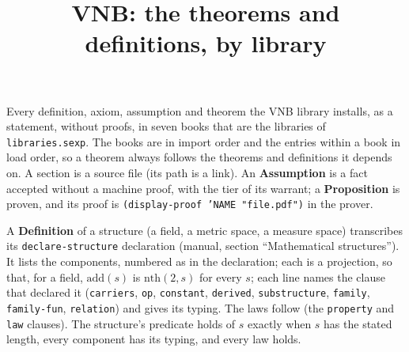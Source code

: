 \documentclass[11pt]{report}
\title{VNB: the theorems and definitions, by library}
\author{}
\date{}
\begin{document}
\maketitle

\noindent
Every definition, axiom, assumption and theorem the VNB library installs, as a
statement, without proofs, in seven books that are the libraries of
\texttt{libraries.sexp}.  The books are in import order and the entries within a
book in load order, so a theorem always follows the theorems and definitions it
depends on.  A section is a source file (its path is a link).  An
\textbf{Assumption} is a fact accepted without a machine proof, with the tier of
its warrant; a \textbf{Proposition} is proven, and its proof is
\texttt{(display-proof 'NAME "file.pdf")} in the prover.

\noindent
A \textbf{Definition} of a structure (a field, a metric space, a measure space)
transcribes its \texttt{declare-structure} declaration (manual, section
``Mathematical structures'').  It lists the components, numbered as in the
declaration; each is a projection, so that, for a field, $\mathrm{add}(s)$ is
$\mathrm{nth}(2, s)$ for every $s$; each line names the clause that declared it
(\texttt{carriers}, \texttt{op}, \texttt{constant}, \texttt{derived},
\texttt{substructure}, \texttt{family}, \texttt{family-fun}, \texttt{relation})
and gives its typing.  The laws follow (the \texttt{property} and \texttt{law}
clauses).  The structure's predicate holds of $s$ exactly when $s$ has the stated
length, every component has its typing, and every law holds.


\end{document}
